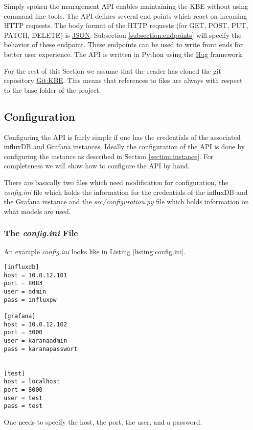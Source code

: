 \lstset{language=Python}          %
Simply spoken the management API enables maintaining the KBE without using command line tools. The API defines several end points which react on incoming HTTP requests. The body format of the HTTP requests (for GET, POST, PUT, PATCH, DELETE) is \href{http://json.org/}{JSON}. Subsection \ref{subsection:endpoints} will specify the behavior of these endpoint. These endpoints can be used to write front ends for better user experience. 
The API is written in Python using the \href{http://www.hug.rest/}{Hug} framework.

For the rest of this Section we assume that the reader has cloned the git repository \href{http://gitlab.me-soldesign.com/karana/backend-api.git}{Git:KBE}. This means that references to files are always with respect to the base folder of the project. 

\subsection{Configuration}
Configuring the API is fairly simple if one has the credentials of the associated influxDB and Grafana instances. Ideally the configuration of the API is done by configuring the instance as described in Section \ref{section:instance}. For completeness we will show how to configure the API by hand. 

There are basically two files which need modification for configuration, the \textit{config.ini} file which holds the information for the credentials of the influxDB and the Grafana instance and the \textit{src/configuration.py} file which holds information on what models are used.

\subsubsection{The \textit{config.ini} File}
An example  \textit{config.ini} looks like in Listing \ref{listing:config.ini}.
\lstset{language=XML}  
\begin{lstlisting}[caption={Example of a \textit{config.ini} file},label={listing:config.ini}]
[influxdb]
host = 10.0.12.101
port = 8083
user = admin
pass = influxpw

[grafana]
host = 10.0.12.102
port = 3000
user = karanaadmin
pass = karanapasswort


[test]
host = localhost
port = 8000
user = test
pass = test
\end{lstlisting}
One needs to specify the host, the port, the user, and a password. 

